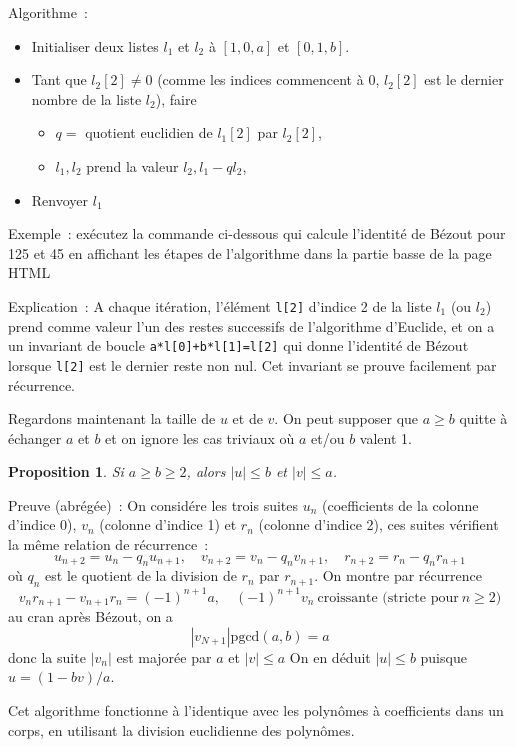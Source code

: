\documentclass[a4paper,11pt]{book}
\newtheorem{prop}[thm]{Proposition}
\begin{document}
\begin{giacjshere}
Algorithme~:
\begin{itemize}
\item Initialiser deux listes $l_1$ et $l_2$ \`a $[1,0,a]$ et $[0,1,b]$.
\item Tant que $l_2[2] \neq 0$ (comme les indices
commencent \`a 0, $l_2[2]$ est le dernier nombre de la liste $l_2$),
faire 
\begin{itemize}
\item $q=$ quotient euclidien de $l_1[2]$ par $l_2[2]$, 
\item $l_1, l_2$ prend la valeur $l_2,l_1-ql_2$, 
\end{itemize}
\item Renvoyer $l_1$
\end{itemize}
Exemple~: ex\'ecutez la commande ci-dessous qui calcule
l'identit\'e de B\'ezout pour 125 et 45 en affichant les \'etapes de
l'algorithme dans la partie basse de la page HTML\\

Explication~: A chaque it\'eration, l'\'el\'ement \verb|l[2]|
d'indice 2 de la liste $l_1$ (ou $l_2$) prend comme valeur l'un des restes 
successifs de l'algorithme d'Euclide,
et on a un invariant de boucle \verb|a*l[0]+b*l[1]=l[2]|
qui donne l'identit\'e de B\'ezout lorsque \verb|l[2]| est le
dernier reste non nul.
Cet invariant se prouve facilement par r\'ecurrence.

Regardons maintenant la taille de $u$ et de $v$.
On peut supposer que $a \geq b$
quitte \`a \'echanger $a$ et $b$ et on ignore
les cas triviaux o\`u $a$
et/ou $b$ valent 1.
\begin{prop} 
Si $a \geq b \geq 2$, alors $|u| \leq b$ 
et $|v| \leq a$. 
\end{prop}
Preuve (abr\'eg\'ee)~: On consid\'ere les trois suites
$u_n$ (coefficients de la colonne d'indice 0), $v_n$ (colonne d'indice
1) et $r_n$ (colonne d'indice 2), ces suites v\'erifient la m\^eme
relation de r\'ecurrence~: 
$$ u_{n+2}=u_n-q_nu_{n+1}, \quad v_{n+2}=v_n-q_nv_{n+1}, \quad
r_{n+2}=r_n-q_nr_{n+1}$$
o\`u $q_n$ est le quotient de la division de $r_n$ par $r_{n+1}$.
On montre par récurrence 
$$ v_n r_{n+1}-v_{n+1} r_n=(-1)^{n+1} a, \quad (-1)^{n+1}v_n \ 
\mbox{croissante (stricte pour}\ n\geq 2 )$$
au cran apr\`es B\'ezout, on a 
$$|v_{N+1}| \mbox{pgcd}(a,b)=a $$
donc la suite $|v_n|$ est major\'ee par $a$ et $|v| \leq a$
On en d\'eduit $|u| \leq b$ puisque $u=(1-bv)/a$.

Cet algorithme fonctionne \`a l'identique avec les polyn\^omes 
\`a coefficients dans un corps, en
utilisant la division euclidienne des polyn\^omes.


\end{giacjshere}
\end{document}
